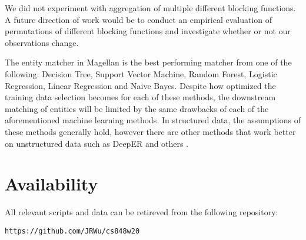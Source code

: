 \documentclass[letterpaper,twocolumn,10pt]{article}
\begin{document}
We did not experiment with aggregation of multiple different blocking functions. A future direction of work would be to conduct an empirical evaluation of permutations of different blocking functions and investigate whether or not our observations change. 

The entity matcher in Magellan is the best performing matcher from one of the following: Decision Tree, Support Vector Machine, Random Forest, Logistic Regression, Linear Regression and Naive Bayes. Despite how optimized the training data selection becomes for each of these methods, the downstream matching of entities will be limited by the same drawbacks of each of the aforementioned machine learning methods. In structured data, the assumptions of these methods generally hold, however there are other methods that work better on unstructured data such as DeepER and others \cite{ebraheem2017deeper, mudgal2018deep}.


\section{Availability}\label{Availability}
All relevant scripts and data can be retireved from the following repository:
\begin{center}
{\tt https://github.com/JRWu/cs848w20}
\end{center}

{\footnotesize 

\theendnotes

\newpage
}
\end{document}
